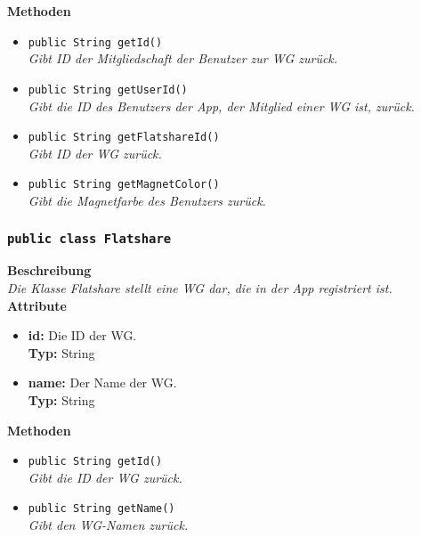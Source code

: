 	\textbf{Methoden}
	\begin{itemize}
		\item\texttt{{public String getId()}}\\
		\textit{Gibt ID der Mitgliedschaft der Benutzer zur WG zurück.}\\
		
		\item\texttt{{public String getUserId()}}\\
		\textit{Gibt die ID des Benutzers der App, der Mitglied einer WG ist, zurück.}\\
		
		\item\texttt{{public String getFlatshareId()}}\\
		\textit{Gibt ID der WG zurück.}\\
		
		\item\texttt{{public String getMagnetColor()}}\\
		\textit{Gibt die Magnetfarbe des Benutzers zurück.}\\
	\end{itemize}       

\subsubsection{\texttt{public class Flatshare}}

	\textbf{Beschreibung} \\
	\textit{Die Klasse Flatshare stellt eine WG dar, die in der App registriert ist.} \\
	
	\textbf{Attribute}
	\begin{itemize}
		\item \textbf{id:} Die ID der WG. \\
		\textbf{Typ:} String
		\item \textbf{name:} Der Name der WG. \\
		\textbf{Typ:} String
	\end{itemize}

	\textbf{Methoden}
	\begin{itemize}
		\item\texttt{{public String getId()}}\\
		\textit{Gibt die ID der WG zurück.}\\
		\item\texttt{{public String getName()}}\\
		\textit{Gibt den WG-Namen zurück.}\\
	\end{itemize}

